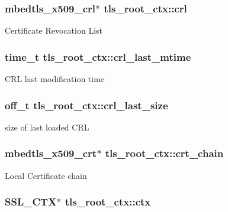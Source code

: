 \subsubsection[{crl}]{\setlength{\rightskip}{0pt plus 5cm}mbedtls\+\_\+x509\+\_\+crl$\ast$ tls\+\_\+root\+\_\+ctx\+::crl}\label{structtls__root__ctx_a03ca403f806d7d60d1b8f2d0d56d0e0d}
Certificate Revocation List \hypertarget{structtls__root__ctx_a9cde6d158aa07a2aee5133676669b725}{}
\subsubsection[{crl\+\_\+last\+\_\+mtime}]{\setlength{\rightskip}{0pt plus 5cm}time\+\_\+t tls\+\_\+root\+\_\+ctx\+::crl\+\_\+last\+\_\+mtime}\label{structtls__root__ctx_a9cde6d158aa07a2aee5133676669b725}
C\+R\+L last modification time \hypertarget{structtls__root__ctx_a1df9958887a4449153c563a7e318077d}{}
\subsubsection[{crl\+\_\+last\+\_\+size}]{\setlength{\rightskip}{0pt plus 5cm}off\+\_\+t tls\+\_\+root\+\_\+ctx\+::crl\+\_\+last\+\_\+size}\label{structtls__root__ctx_a1df9958887a4449153c563a7e318077d}
size of last loaded C\+R\+L \hypertarget{structtls__root__ctx_a272ecb7b6152dea69b53317f491fe81d}{}
\subsubsection[{crt\+\_\+chain}]{\setlength{\rightskip}{0pt plus 5cm}mbedtls\+\_\+x509\+\_\+crt$\ast$ tls\+\_\+root\+\_\+ctx\+::crt\+\_\+chain}\label{structtls__root__ctx_a272ecb7b6152dea69b53317f491fe81d}
Local Certificate chain \hypertarget{structtls__root__ctx_a800d3fe22d25ed24ae39e51b55cb785d}{}
\subsubsection[{ctx}]{\setlength{\rightskip}{0pt plus 5cm}S\+S\+L\+\_\+\+C\+T\+X$\ast$ tls\+\_\+root\+\_\+ctx\+::ctx}\label{structtls__root__ctx_a800d3fe22d25ed24ae39e51b55cb785d}
\hypertarget{structtls__root__ctx_a9aaf4284e2fa54b38e57070057a28a2e}{}

